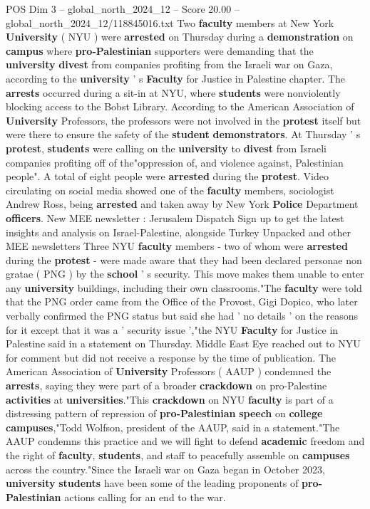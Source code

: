 \begin{textsample}{POS Dim 3 – global\_north\_2024\_12 – Score 20.00 – global\_north\_2024\_12/118845016.txt}  \label{ex:f3_pos_229}
Two \textbf{faculty} members at New York \textbf{University} ( NYU ) were \textbf{arrested} on Thursday during a \textbf{demonstration} on \textbf{campus} where \textbf{pro-Palestinian} supporters were demanding that the \textbf{university} \textbf{divest} from companies profiting from the Israeli war on Gaza, according to the \textbf{university} ' s \textbf{Faculty} for Justice in Palestine chapter.
The \textbf{arrests} occurred during a sit-in at NYU, where \textbf{students} were nonviolently blocking access to the Bobst Library.
According to the American Association of \textbf{University} Professors, the professors were not involved in the \textbf{protest} itself but were there to ensure the safety of the \textbf{student} \textbf{demonstrators}.
At Thursday ' s \textbf{protest}, \textbf{students} were calling on the \textbf{university} to \textbf{divest} from Israeli companies profiting off of the"oppression of, and violence against, Palestinian people".
A total of eight people were \textbf{arrested} during the \textbf{protest}.
Video circulating on social media showed one of the \textbf{faculty} members, sociologist Andrew Ross, being \textbf{arrested} and taken away by New York \textbf{Police} Department \textbf{officers}.
New MEE newsletter : Jerusalem Dispatch Sign up to get the latest insights and analysis on Israel-Palestine, alongside Turkey Unpacked and other MEE newsletters Three NYU \textbf{faculty} members - two of whom were \textbf{arrested} during the \textbf{protest} - were made aware that they had been declared personae non gratae ( PNG ) by the \textbf{school} ' s security.
This move makes them unable to enter any \textbf{university} buildings, including their own classrooms."The \textbf{faculty} were told that the PNG order came from the Office of the Provost, Gigi Dopico, who later verbally confirmed the PNG status but said she had ' no details ' on the reasons for it except that it was a ' security issue ',"the NYU \textbf{Faculty} for Justice in Palestine said in a statement on Thursday.
Middle East Eye reached out to NYU for comment but did not receive a response by the time of publication.
The American Association of \textbf{University} Professors ( AAUP ) condemned the \textbf{arrests}, saying they were part of a broader \textbf{crackdown} on pro-Palestine \textbf{activities} at \textbf{universities}."This \textbf{crackdown} on NYU \textbf{faculty} is part of a distressing pattern of repression of \textbf{pro-Palestinian} \textbf{speech} on \textbf{college} \textbf{campuses},"Todd Wolfson, president of the AAUP, said in a statement."The AAUP condemns this practice and we will fight to defend \textbf{academic} freedom and the right of \textbf{faculty}, \textbf{students}, and staff to peacefully assemble on \textbf{campuses} across the country."Since the Israeli war on Gaza began in October 2023, \textbf{university} \textbf{students} have been some of the leading proponents of \textbf{pro-Palestinian} actions calling for an end to the war.

\end{textsample}
